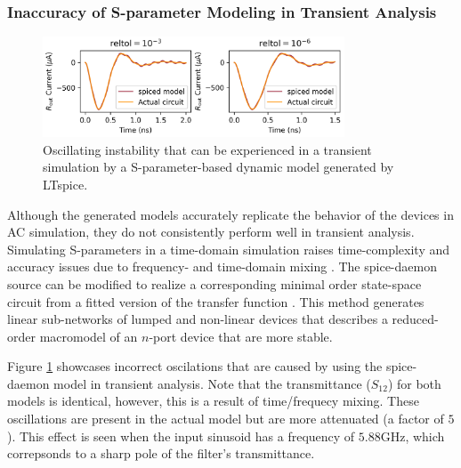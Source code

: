\subsubsection{Inaccuracy of S-parameter Modeling in Transient Analysis}

\begin{figure}
    \centering
    \includegraphics[width=0.8\textwidth]{figs/td_LC_sad.png}
    \caption{Oscillating instability that can be experienced in a transient simulation
    by a S-parameter-based dynamic model generated by LTspice.}
    \label{fig:td_sparam_sad}
\end{figure}

Although the generated models accurately replicate the behavior of the devices in 
AC simulation, they do not consistently perform well in transient analysis.
Simulating S-parameters in a time-domain simulation raises 
time-complexity and accuracy issues due to frequency- and time-domain 
mixing \cite{td-fd-mixing}.
The spice-daemon source can be modified to realize a corresponding 
minimal order state-space circuit from a fitted version of the transfer 
function \cite{arb-sparam-spice}.
This method generates linear sub-networks of lumped and non-linear devices
that describes a reduced-order macromodel of an $n$-port device that
are more stable.

Figure \ref{fig:td_sparam_sad} showcases incorrect oscilations that are caused by
using the spice-daemon model in transient analysis. Note that the transmittance ($S_{12}$)
for both models is identical, however, this is a result of time/frequecy mixing.
These oscillations are present in the actual model but are more attenuated (a factor
of $5$). This effect is seen when the input sinusoid has a frequency of $5.88$GHz,
which correpsonds to a sharp pole of the filter's transmittance.


